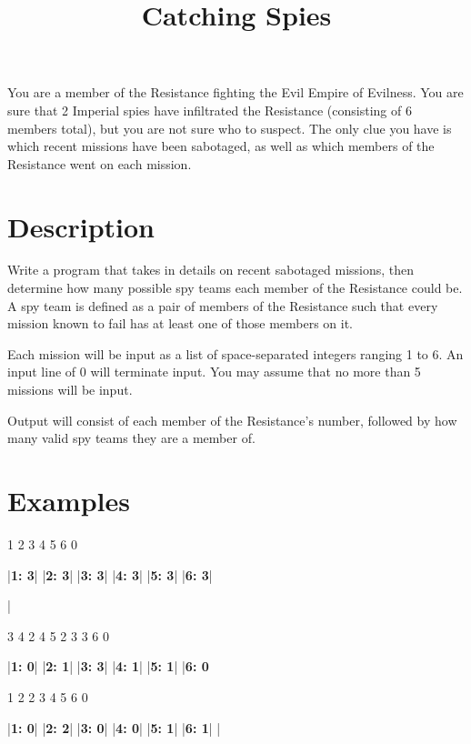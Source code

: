 \documentclass{../codeproblem}
\begin{document}
\title{Catching Spies}

\begin{flavor}
  You are a member of the Resistance fighting the Evil Empire of Evilness. You are sure that 2 Imperial spies have infiltrated the Resistance (consisting of 6 members total), but you are not sure who to suspect. The only clue you have is which recent missions have been sabotaged, as well as which members of the Resistance went on each mission.
\end{flavor}

\section*{Description}
Write a program that takes in details on recent sabotaged missions, then determine how many possible spy teams each member of the Resistance could be. A spy team is defined as a pair of members of the Resistance such that every mission known to fail has at least one of those members on it.

Each mission will be input as a list of space-separated integers ranging 1 to 6. An input line of 0 will terminate input. You may assume that no more than 5 missions will be input.

Output will consist of each member of the Resistance's number, followed by how many valid spy teams they are a member of.

\section*{Examples}
\begin{minipage}[t]{.33\linewidth}
\begin{example}
1 2 3
4 5 6
0

|\textbf{1: 3}|
|\textbf{2: 3}|
|\textbf{3: 3}|
|\textbf{4: 3}|
|\textbf{5: 3}|
|\textbf{6: 3}|

|\end{example}
\end{minipage}
\begin{minipage}[t]{.33\linewidth}
\begin{example}
3 4
2 4 5
2 3
3 6
0

|\textbf{1: 0}|
|\textbf{2: 1}|
|\textbf{3: 3}|
|\textbf{4: 1}|
|\textbf{5: 1}|
|\textbf{6: 0}\end{example}
\end{minipage}
\begin{minipage}[t]{.33\linewidth}
\begin{example}
1 2
2 3 4
5 6
0

|\textbf{1: 0}|
|\textbf{2: 2}|
|\textbf{3: 0}|
|\textbf{4: 0}|
|\textbf{5: 1}|
|\textbf{6: 1}|
|\end{example}
\end{minipage}
\end{document}
